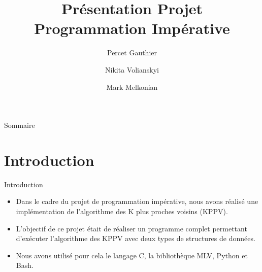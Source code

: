 \documentclass{beamer}
\title[Projet Programmation Imp]{Présentation Projet Programmation Impérative}
\author[G.Percet, N.Volianskyi, M.Melkonian]{Percet Gauthier \and Nikita Volianskyi \and Mark Melkonian}
\date{}
\begin{document}
	\begin{frame}[plain]
		\maketitle
	\end{frame}

	\begin{frame}{Sommaire}
		\tableofcontents
	\end{frame}

	\section{Introduction}
	\begin{frame}{Introduction}
		\begin{itemize}
			\item Dans le cadre du projet de programmation impérative, nous avons réalisé une implémentation de l'algorithme des K plus proches voisins (KPPV).
			\item L'objectif de ce projet était de réaliser un programme complet permettant d'exécuter l'algorithme des KPPV avec deux types de structures de données.
			\item Nous avons utilisé pour cela le langage C, la bibliothèque MLV, Python et Bash.
		\end{itemize}
	\end{frame}
\end{document}
